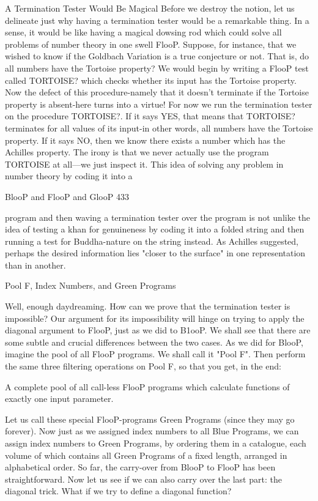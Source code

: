                    A Termination Tester Would Be Magical
Before we destroy the notion, let us delineate just why having a termination tester would
be a remarkable thing. In a sense, it would be like having a magical dowsing rod which
could solve all problems of number theory in one swell FlooP. Suppose, for instance, that
we wished to know if the Goldbach Variation is a true conjecture or not. That is, do all
numbers have the Tortoise property? We would begin by writing a FlooP test called
TORTOISE? which checks whether its input has the Tortoise property. Now the defect
of this procedure-namely that it doesn't terminate if the Tortoise property is absent-here
turns into a virtue! For now we run the termination tester on the procedure TORTOISE?.
If it says YES, that means that TORTOISE? terminates for all values of its input-in other
words, all numbers have the Tortoise property. If it says NO, then we know there exists a
number which has the Achilles property. The irony is that we never actually use the
program TORTOISE at all—we just inspect it.
         This idea of solving any problem in number theory by coding it into a




BlooP and FlooP and GlooP                                                               433

program and then waving a termination tester over the program is not unlike the idea of
testing a khan for genuineness by coding it into a folded string and then running a test for
Buddha-nature on the string instead. As
Achilles suggested, perhaps the desired information lies "closer to the surface" in one
representation than in another.

                 Pool F, Index Numbers, and Green Programs

Well, enough daydreaming. How can we prove that the termination tester is impossible?
Our argument for its impossibility will hinge on trying to apply the diagonal argument to
FlooP, just as we did to B1ooP. We shall see that there are some subtle and crucial
differences between the two cases.
        As we did for BlooP, imagine the pool of all FlooP programs. We shall call it
"Pool F". Then perform the same three filtering operations on Pool F, so that you get, in
the end:

   A complete pool of all call-less FlooP programs which calculate functions of
   exactly one input parameter.

Let us call these special FlooP-programs Green Programs (since they may go forever).
        Now just as we assigned index numbers to all Blue Programs, we can assign
index numbers to Green Programs, by ordering them in a catalogue, each volume of
which contains all Green Programs of a fixed length, arranged in alphabetical order.
So far, the carry-over from BlooP to FlooP has been straightforward. Now let us see if we
can also carry over the last part: the diagonal trick. What if we try to define a diagonal
function?

